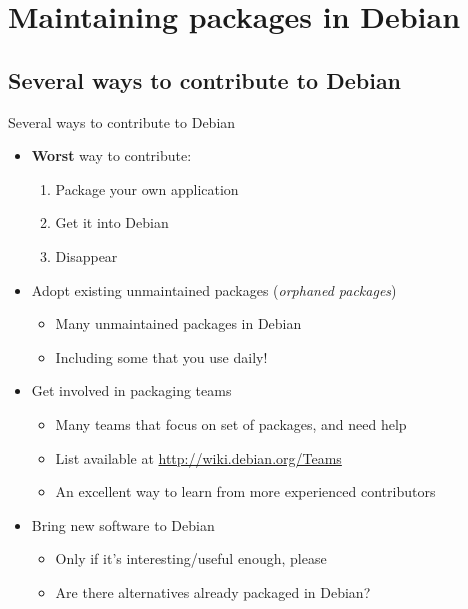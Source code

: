 \documentclass[10pt,final]{beamer}
\begin{document}
\section{Maintaining packages in Debian}
\subsection{Several ways to contribute to Debian}
\begin{frame}{Several ways to contribute to Debian}
  \begin{itemize}
  \item \textbf{Worst} way to contribute:
    \begin{enumerate}
    \item Package your own application
    \item Get it into Debian
    \item Disappear
    \end{enumerate}
    \br
  \item Adopt existing unmaintained packages (\textsl{orphaned packages})
    \begin{itemize}
    \item Many unmaintained packages in Debian
    \item Including some that you use daily!
    \end{itemize}
    \br
  \item Get involved in packaging teams
    \begin{itemize}
    \item Many teams that focus on set of packages, and need help
    \item List available at \url{http://wiki.debian.org/Teams}
    \item An excellent way to learn from more experienced contributors
    \end{itemize}
    \br
  \item Bring new software to Debian
    \begin{itemize}
    \item Only if it's interesting/useful enough, please
    \item Are there alternatives already packaged in Debian?
    \end{itemize}
  \end{itemize}
\end{frame}
\end{document}

